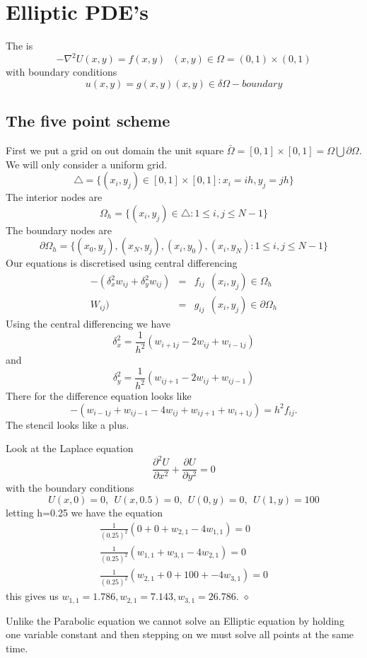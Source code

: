 \chapter{Elliptic PDE's}
The  is
\[ -\nabla^2U(x,y)=f(x,y) \ \ \ (x,y) \in \Omega=(0,1)\times (0,1) \]
with boundary conditions
\[u(x,y) = g(x,y) (x,y)\in\delta\Omega-boundary \]
\section{The five point scheme}
First we put a grid on out domain the unit square $\bar{\Omega}=[0,1]\times[0,1]=\Omega \bigcup \partial\Omega$. We will only consider a uniform grid.
\[ \triangle = \{(x_i,y_j)\in [0,1]\times[0,1]:x_i=ih,y_j=jh \}\]
The interior nodes are
\[ \Omega_h= \{(x_i,y_j)\in \triangle:1\leq i,j\leq N-1 \}\]
The boundary nodes are
\[ \partial\Omega_h= \{(x_0,y_j),(x_{N},y_j),(x_{i},y_0),(x_{i},y_N)
:1\leq i,j\leq N-1 \}\]
Our equations is discretised using central differencing
\begin{eqnarray*}
-(\delta_x^2w_{ij}+\delta_y^2w_{ij})&=&f_{ij} \ \ (x_i,y_j) \in \Omega_h \\
W_{ij})&=&g_{ij} \ \ (x_i,y_j) \in \partial\Omega_h 
\end{eqnarray*}
Using the central differencing we have
\[\delta_x^2=\frac{1}{h^2}(w_{i+1j}-2w_{ij}+w_{i-1j}) \]
and
\[\delta_y^2=\frac{1}{h^2}(w_{ij+1}-2w_{ij}+w_{ij-1}) \]
There for the difference equation looks like
\[-(w_{i-1j}+w_{ij-1}-4w_{ij}+w_{ij+1}+w_{i+1j})=h^2f_{ij}. \]
The stencil looks like a plus.
\begin{example}
Look at the Laplace equation
\[\frac{\partial^2 U}{\partial x^2}+\frac{\partial U}{\partial y^2}=0
\]
with the boundary conditions
\[U(x,0)=0, \ \ U(x,0.5)=0, \ \ U(0,y)=0, \ \ U(1,y)=100 \]
letting h=0.25 we have the equation
\begin{eqnarray*}
 \frac{1}{(0.25)^2}(0+0+w_{2,1}-4w_{1,1})=0 \\
 \frac{1}{(0.25)^2}(w_{1,1}+w_{3,1}-4w_{2,1})=0 \\
 \frac{1}{(0.25)^2}(w_{2,1}+0+100+-4w_{3,1})=0 
\end{eqnarray*}
this gives us $w_{1,1}=1.786, w_{2,1}=7.143, w_{3,1}=26.786$.
$\diamond$\\
\end{example}
Unlike the Parabolic equation we cannot solve an Elliptic equation by holding one
variable constant and then stepping on we must solve all points at the same time.\\
